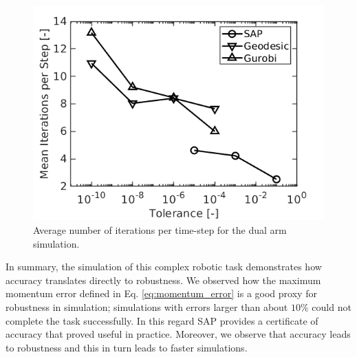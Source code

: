 \begin{figure}[!h]
	\centering
    \includegraphics[width=0.7\columnwidth]{figures/dual_arm/iterations_per_step.png}
    \caption{\label{fig:dual_arm_iterations} Average number of iterations per
    time-step for the dual arm simulation.}
\end{figure}

In summary, the simulation of this complex robotic task demonstrates how
accuracy translates directly to robustness. We observed how the maximum momentum
error defined in Eq. \eqref{eq:momentum_error} is a good proxy for robustness in
simulation; simulations with errors larger than about $10\%$ could not complete
the task successfully. In this regard SAP provides a certificate of accuracy
that proved useful in practice. Moreover, we observe that accuracy leads to
robustness and this in turn leads to faster simulations.

